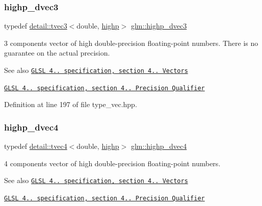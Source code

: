 \subsubsection{\texorpdfstring{highp\+\_\+dvec3}{highp\_dvec3}}
{\footnotesize\ttfamily typedef \hyperlink{structglm_1_1detail_1_1tvec3}{detail\+::tvec3}$<$double, \hyperlink{namespaceglm_a0f04f086094c747d227af4425893f545ac6f7eab42eacbb10d59a58e95e362074}{highp}$>$ \hyperlink{group__core__precision_ga4962711854156dae8ebb4eb39237c542}{glm\+::highp\+\_\+dvec3}}

3 components vector of high double-\/precision floating-\/point numbers. There is no guarantee on the actual precision.

\begin{DoxySeeAlso}{See also}
\href{http://www.opengl.org/registry/doc/GLSLangSpec.4.20.8.pdf}{\tt G\+L\+SL 4.. specification, section 4.. Vectors} 

\href{http://www.opengl.org/registry/doc/GLSLangSpec.4.20.8.pdf}{\tt G\+L\+SL 4.. specification, section 4.. Precision Qualifier} 
\end{DoxySeeAlso}


Definition at line 197 of file type\+\_\+vec.\+hpp.

\mbox{\label{group__core__precision_gad5ff5ff4a69e6925f5b4f540e2633835}} 
\subsubsection{\texorpdfstring{highp\+\_\+dvec4}{highp\_dvec4}}
{\footnotesize\ttfamily typedef \hyperlink{structglm_1_1detail_1_1tvec4}{detail\+::tvec4}$<$double, \hyperlink{namespaceglm_a0f04f086094c747d227af4425893f545ac6f7eab42eacbb10d59a58e95e362074}{highp}$>$ \hyperlink{group__core__precision_gad5ff5ff4a69e6925f5b4f540e2633835}{glm\+::highp\+\_\+dvec4}}

4 components vector of high double-\/precision floating-\/point numbers.

\begin{DoxySeeAlso}{See also}
\href{http://www.opengl.org/registry/doc/GLSLangSpec.4.20.8.pdf}{\tt G\+L\+SL 4.. specification, section 4.. Vectors} 

\href{http://www.opengl.org/registry/doc/GLSLangSpec.4.20.8.pdf}{\tt G\+L\+SL 4.. specification, section 4.. Precision Qualifier} 
\end{DoxySeeAlso}


